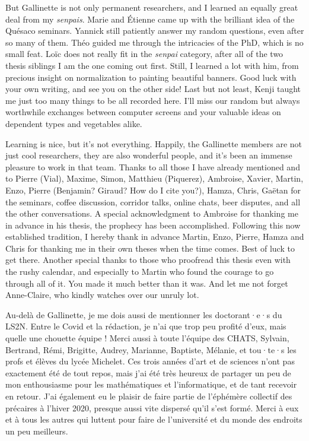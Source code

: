 But Gallinette is not only permanent researchers, and I learned an equally great deal from
my \textit{senpais}. Marie and Étienne came up with the brilliant idea of the Quésaco seminars.
Yannick still patiently answer my random questions, even after so many of them.
Théo guided me through the intricacies of the PhD, which is no small feat.
Loïc does not really fit in the \textit{senpai} category,
after all of the two thesis siblings I am
the one coming out first. Still, I learned a lot with him, from precious insight on
normalization to painting beautiful banners.
Good luck with your own writing, and see you on the other side!
Last but not least, Kenji taught me just too many things to be all recorded here.
I’ll miss our random but always worthwhile exchanges between computer screens and your
valuable ideas on dependent types and vegetables alike.

Learning is nice, but it’s not everything. Happily, the Gallinette members are not just
cool researchers, they are also wonderful people, and it’s been an immense pleasure to work
in that team. Thanks to all those I have already mentioned and to
Pierre (Vial), Maxime, Simon, Matthieu (Piquerez), Ambroise, Xavier, Martin, Enzo,
Pierre (Benjamin? Giraud? How do I cite you?), Hamza, Chris, Gaëtan
for the seminars, coffee discussion, corridor talks, online chats, beer disputes,
and all the other conversations. A special acknowledgment to Ambroise for thanking me in
advance in his thesis, the prophecy has been accomplished.
Following this now established tradition, I hereby thank in advance
Martin, Enzo, Pierre, Hamza and Chris for thanking me in their own theses when the time comes.
Best of luck to get there.
Another special thanks to those who proofread this thesis even with the rushy calendar,
and especially to Martin who found the courage to go through all of it. You made it much
better than it was.
And let me not forget Anne-Claire, who kindly watches over our unruly lot.


Au-delà de Gallinette, je me dois aussi de mentionner les doctorant·e·s du LS2N.
Entre le Covid et la rédaction, je n’ai que trop peu profité d’eux, mais quelle
une chouette équipe ! Merci aussi à toute l’équipe des CHATS, Sylvain, Bertrand, Rémi,
Brigitte, Audrey, Marianne, Baptiste, Mélanie, et tou·te·s les profs et élèves du lycée
Michelet. Ces trois années d’art et de sciences n’ont pas exactement été de tout repos,
mais j’ai été très heureux de partager un peu de mon enthousiasme pour
les mathématiques et l’informatique, et de tant recevoir en retour.
J’ai également eu le plaisir de faire partie de l’éphémère collectif des précaires à l’hiver
2020, presque aussi vite dispersé qu’il s’est formé.
Merci à eux et à tous les autres qui luttent pour faire de l’université et
du monde des endroits un peu meilleurs.

